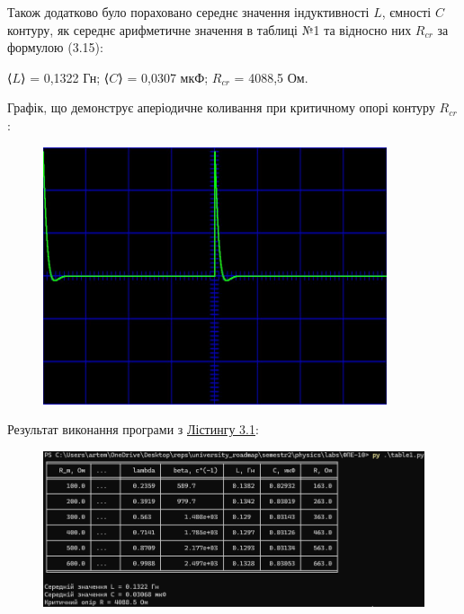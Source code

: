 \documentclass[12pt,a4paper]{article}
\begin{document}
    Також додатково було пораховано середнє значення індуктивності $L$, ємності $C$ контуру, як середнє арифметичне значення в таблиці №1 та відносно них
    $R_{cr}$ за формулою (3.15):

    \vspace{1em} %
    \setlength{\parindent}{0pt}

    ⟨$L$⟩ = 0,1322 Гн; ⟨$C$⟩ = 0,0307 мкФ;   $R_{cr}$ = 4088,5 Ом.

    \newpage

    Графік, що демонструє аперіодичне коливання при критичному опорі контуру $R_{cr}$:

    \begin{figure}[ht]
        \includegraphics[width=0.9\textwidth]{aperiodic1.jpg}
    \end{figure}

    \vspace{1em}

    Результат виконання програми з \hyperlink{listing1}{Лістингу 3.1}:

    \begin{figure}[ht]
        \centering
        \includegraphics[width=1\textwidth]{table1.png}
    \end{figure}
\end{document}
